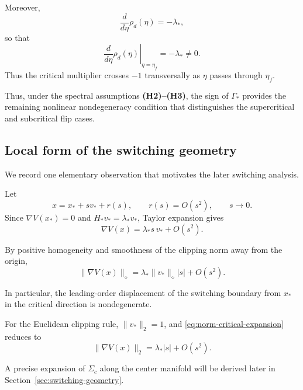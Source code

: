 Moreover,
\begin{equation}
\frac{d}{d\eta}\rho_d(\eta)
=
-\lambda_*,
\label{eq:eigenvalue-crossing}
\end{equation}
so that
\begin{equation}
\left.
\frac{d}{d\eta}\rho_d(\eta)
\right|_{\eta=\eta_f}
=
-\lambda_*
\neq0.
\label{eq:transversal-crossing}
\end{equation}
Thus the critical multiplier crosses $-1$ transversally as $\eta$
passes through $\eta_f$.

Thus, under the spectral assumptions \textbf{(H2)--(H3)}, the sign of
$\Gamma_*$ provides the remaining nonlinear nondegeneracy condition
that distinguishes the supercritical and subcritical flip cases.

\subsection{Local form of the switching geometry}
\label{subsec:local-switching-preview}

We record one elementary observation that motivates the later
switching analysis.

Let
\[
x=x_*+sv_*+r(s),
\qquad
r(s)=O(s^2),
\qquad
s\to0.
\]
Since $\nabla V(x_*)=0$ and $H_*v_*=\lambda_*v_*$,
Taylor expansion gives
\begin{equation}
\nabla V(x)
=
\lambda_*s\,v_*
+
O(s^2).
\label{eq:gradient-critical-expansion}
\end{equation}

By positive homogeneity and smoothness of the clipping norm away
from the origin,
\begin{equation}
\|\nabla V(x)\|_\diamond
=
\lambda_*
\|v_*\|_\diamond
|s|
+
O(s^2).
\label{eq:norm-critical-expansion}
\end{equation}

In particular, the leading-order displacement of the switching
boundary from $x_*$ in the critical direction is nondegenerate.

For the Euclidean clipping rule,
$\|v_*\|_2=1$, and
\eqref{eq:norm-critical-expansion} reduces to
\begin{equation}
\|\nabla V(x)\|_2
=
\lambda_*|s|
+
O(s^2).
\label{eq:euclidean-critical-expansion}
\end{equation}

 A precise expansion of $\Sigma_c$ along the center manifold will be
derived later in Section~\ref{sec:switching-geometry}.

